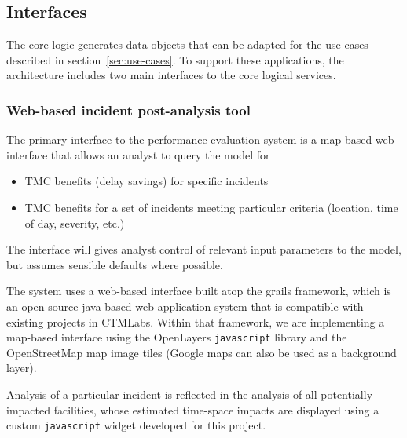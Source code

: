 \documentclass[12pt]{report}
\newif\ifuserguide %
\newcounter{time}
\newcounter{space}
\begin{document}



\subsection{Interfaces}
\label{sec:interfaces}

The core logic generates data objects that can be adapted for the
use-cases described in section~\ref{sec:use-cases}.  To support these
applications, the architecture includes two main interfaces to the
core logical services.  

\subsubsection{Web-based incident post-analysis tool}

The primary interface to the performance evaluation system is a
map-based web interface that allows an analyst to query the model for
\begin{itemize}
\item \ac{TMC} benefits (delay savings) for specific incidents
\item \ac{TMC} benefits for a set of incidents meeting particular criteria
  (location, time of day, severity, etc.)
\end{itemize}
The interface will gives analyst control of relevant input parameters
to the model, but assumes sensible defaults where possible.

The system uses a web-based interface built atop the grails framework, which is
an open-source java-based web application system that is compatible with
existing projects in \ac{CTMLabs}.  Within that framework, we are implementing a
map-based interface using the OpenLayers \texttt{javascript} library
\citep{openlayers10:_openl_user_guide} and the OpenStreetMap map image tiles
\citep{openstreetmap.org10:_opens_devel_guide} (Google maps can also be used as
a background layer).

Analysis of a particular incident is reflected in the analysis of all
potentially impacted facilities, whose estimated time-space impacts are
displayed using a custom \texttt{javascript} widget developed for this project.


\ifuserguide%
Additional detail of the user interface is provided in
appendix~\ref{chap:user-guide}.  
%
\fi
\end{document}
